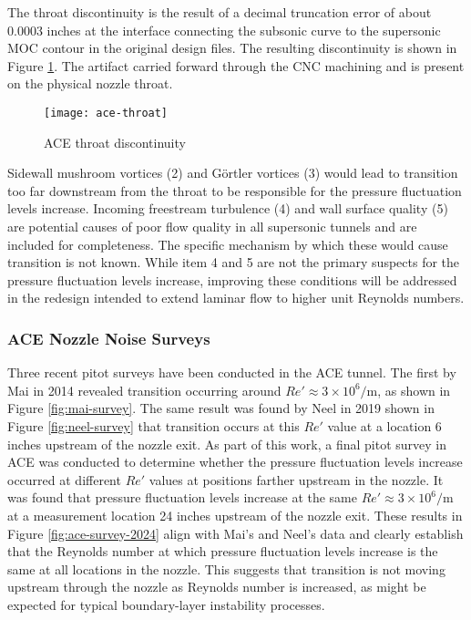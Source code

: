 The throat discontinuity is the result of a decimal truncation error of about 0.0003 inches at the interface connecting the subsonic curve to the supersonic MOC contour in the original design files. The resulting discontinuity is shown in Figure \ref{fig:ace-throat}. The artifact carried forward through the CNC machining and is present on the physical nozzle throat.

\begin{figure}[ht!]
    \centering
    \texttt{[image: ace-throat]}
    \caption{ACE throat discontinuity}
    \label{fig:ace-throat}
\end{figure}


Sidewall mushroom vortices (2) and Görtler vortices (3) would lead to transition too far downstream from the throat to be responsible for the pressure fluctuation levels increase. Incoming freestream turbulence (4) and wall surface quality (5) are potential causes of poor flow quality in all supersonic tunnels and are included for completeness. The specific mechanism by which these would cause transition is not known. While item 4 and 5 are not the primary suspects for the pressure fluctuation levels increase, improving these conditions will be addressed in the redesign intended to extend laminar flow to higher unit Reynolds numbers.

\subsubsection*{ACE Nozzle Noise Surveys}

Three recent pitot surveys have been conducted in the ACE tunnel. The first by Mai in 2014 \cite{mai-dis} revealed transition occurring around $Re' \approx 3 \times 10^6/\mathrm{m}$, as shown in Figure \ref{fig:mai-survey}. The same result was found by Neel in 2019 \cite{neel-dis} shown in Figure \ref{fig:neel-survey} that transition occurs at this $Re'$ value at a location 6 inches upstream of the nozzle exit. As part of this work, a final pitot survey in ACE was conducted to determine whether the pressure fluctuation levels increase occurred at different $Re'$ values at positions farther upstream in the nozzle. It was found that pressure fluctuation levels increase at the same $Re' \approx 3 \times 10^6/\mathrm{m}$ at a measurement location 24 inches upstream of the nozzle exit. These results in Figure \ref{fig:ace-survey-2024} align with Mai's and Neel's data and clearly establish that the Reynolds number at which pressure fluctuation levels increase is the same at all locations in the nozzle. This suggests that transition is not moving upstream through the nozzle as Reynolds number is increased, as might be expected for typical boundary-layer instability processes.

